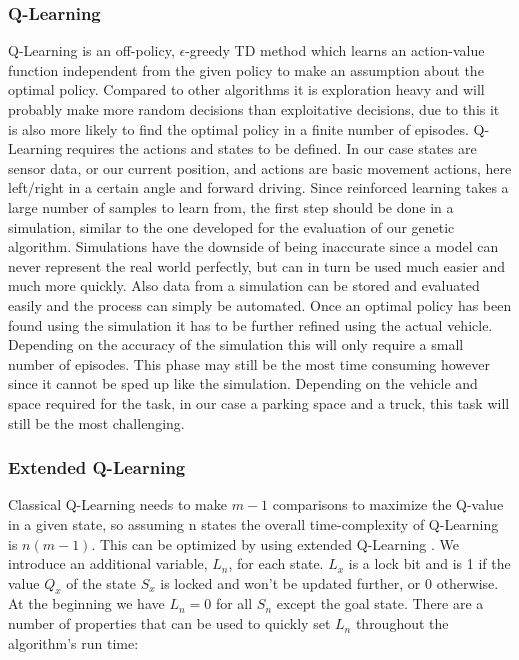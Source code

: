 \subsubsection{Q-Learning}
\label{sec:q-learning}

Q-Learning is an off-policy, $\epsilon$-greedy TD method which learns an action-value function independent from the given policy to make an assumption about the optimal policy. Compared to other algorithms it is exploration heavy and will probably make more random decisions than exploitative decisions, due to this it is also more likely to find the optimal policy in a finite number of episodes. Q-Learning requires the actions and states to be defined. In our case states are sensor data, or our current position, and actions are basic movement actions, here left/right in a certain angle and forward driving. Since reinforced learning takes a large number of samples to learn from, the first step should be done in a simulation, similar to the one developed for the evaluation of our genetic algorithm. Simulations have the downside of being inaccurate since a model can never represent the real world perfectly, but can in turn be used much easier and much more quickly. Also data from a simulation can be stored and evaluated easily and the process can simply be automated. Once an optimal policy has been found using the simulation it has to be further refined using the actual vehicle. Depending on the accuracy of the simulation this will only require a small number of episodes. This phase may still be the most time consuming however since it cannot be sped up like the simulation. Depending on the vehicle and space required for the task, in our case a parking space and a truck, this task will still be the most challenging.

\subsubsection{Extended Q-Learning}
\label{sec:extended-q-learning}
Classical Q-Learning needs to make $m-1$ comparisons to maximize the Q-value in a given state, so assuming n states the overall time-complexity of Q-Learning is $n(m-1)$. This can be optimized by using extended Q-Learning \cite{11}. We introduce an additional variable, $L_n$, for each state. $L_x$ is a lock bit and is 1 if the value $Q_x$ of the state $S_x$ is locked and won't be updated further, or 0 otherwise. At the beginning we have $L_n=0$ for all $S_n$ except the goal state. There are a number of properties that can be used to quickly set $L_n$ throughout the algorithm's run time: 

